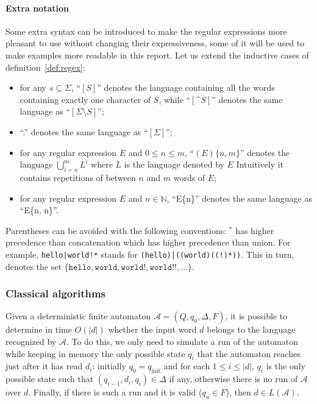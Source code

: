 \documentclass[11px]{article}
\theoremstyle{definition}
\newcommand{\pierre}[1]{\textcolor{magenta}{[\textbf{Pierre:} #1]}}
\begin{document}
        \paragraph{Extra notation}
          Some extra syntax can be introduced to make the regular expressions
          more pleasant to use without changing their expressiveness, some of
          it will be used to make examples more readable in this report. Let us
          extend the inductive cases of definition~\ref{def:regex}:
            \begin{itemize}
              \item for any $s \subseteq \Sigma$, ``$[S]$'' denotes the
                language containing all the words containing exactly one
                character of $S$, while ``$[\texttt{\textasciicircum}S]$''
                denotes the same language as ``$[\Sigma \setminus S]$'';
              \item ``.'' denotes the same language as ``$[\Sigma]$'';
              \item for any regular expression $E$ and $0 \leq n \leq m$,
                ``$(E)\{n,m\}$'' denotes the language $\bigcup_{i=n}^m
                L^i$ where $L$ is the language denoted by $E$ Intuitively it
                contains repetitions of between $n$ and $m$ words of $E$;
              \item for any regular expression $E$ and $n \in \mathbb{N}$,
                ``E\{n\}'' denotes the same language as ``E\{n, n\}''.
            \end{itemize}

          Parentheses can be avoided with the following conventions: ${}^*$ has
          higher precedence than concatenation which has higher precedence than
          union. For example, \texttt{hello|world!*} stands for
          \texttt{(hello)|((world)((!)*))}. This in turn, denotes the set
          $\{\texttt{hello}, \texttt{world}, \texttt{world!}, \texttt{world!!},
          \ldots\}$.


      \subsubsection{Classical algorithms}

        Given a deterministic finite automaton $\mathcal{A} = (Q, q_0, \Delta,
        F)$, it is possible to determine in time $O(|d|)$ whether the input
        word $d$ belongs to the language recognized by $\mathcal{A}$. To do
        this, we only need to simulate a run of the automaton while keeping in
        memory the only possible state $q_i$ that the automaton reaches just
        after it has read $d_i$: initially $q_0 = q_\text{init}$ and for each
        $1 \leq i \leq |d|$, $q_{i}$ is the only possible state such that
        $(q_{i-1}, d_i, q_i) \in \Delta$ if any, otherwise there is no run of
        $\mathcal{A}$ over $d$. Finally, if there is such a run and it is valid
        ($q_n \in F$), then $d \in L(\mathcal{A})$.
\end{document}
